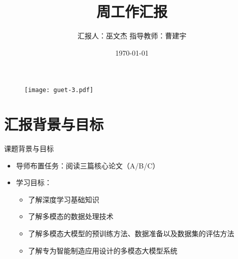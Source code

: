 \documentclass[aspectratio=169,AutoFakeBold]{beamer}
\author{汇报人：巫文杰 \texorpdfstring{\quad}{} 指导教师：曹建宇}
\title{周工作汇报}
\institute{计算机与信息安全学院}
\date{\today}
\begin{document}
\kaishu
\begin{frame}
    \titlepage
    \begin{figure}[htpb]
        \begin{center}
            \texttt{[image: guet-3.pdf]}
        \end{center}
    \end{figure}
\end{frame}

\begin{frame}
    \tableofcontents[sectionstyle=show,subsectionstyle=show/shaded/hide,subsubsectionstyle=show/shaded/hide]    
\end{frame}

\section{汇报背景与目标}
\begin{frame}{课题背景与目标}
    \begin{itemize}
        \item 导师布置任务：阅读三篇核心论文（A/B/C）
        \item 学习目标：
            \begin{itemize}
                \item 了解深度学习基础知识
                \item 了解多模态的数据处理技术
                \item 了解多模态大模型的预训练方法、数据准备以及数据集的评估方法
                \item 了解专为智能制造应用设计的多模态大模型系统
            \end{itemize}
    \end{itemize}
\end{frame}
\end{document}
